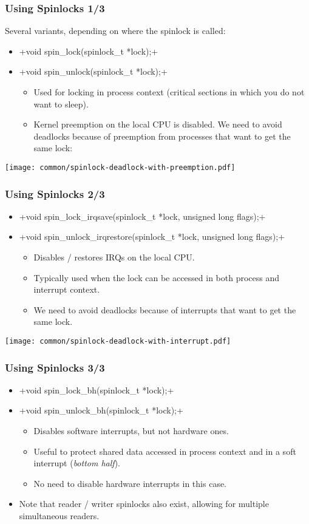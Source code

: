 \begin{frame}[fragile]
  \frametitle{Using Spinlocks 1/3}
  Several variants, depending on where the spinlock is called:
  \begin{itemize}
  \item {}+void spin_lock(spinlock_t *lock);+
  \item {}+void spin_unlock(spinlock_t *lock);+
    \begin{itemize}
    \item Used for locking in process context (critical sections
          in which you do not want to sleep).
    \item Kernel preemption on the local CPU is disabled. We need
          to avoid deadlocks because of preemption from processes
	  that want to get the same lock:
    \end{itemize}
  \end{itemize}
  \texttt{[image: common/spinlock-deadlock-with-preemption.pdf]}
\end{frame}

\begin{frame}[fragile]
  \frametitle{Using Spinlocks 2/3}
  \begin{itemize}
  \item {}+void spin_lock_irqsave(spinlock_t *lock, unsigned long flags);+
  \item {}+void spin_unlock_irqrestore(spinlock_t *lock, unsigned long flags);+
    \begin{itemize}
    \item Disables / restores IRQs on the local CPU.
    \item Typically used when the lock can be accessed in both process
      and interrupt context.
    \item We need to avoid deadlocks because of interrupts that want
          to get the same lock.
    \end{itemize}
  \end{itemize}
  \texttt{[image: common/spinlock-deadlock-with-interrupt.pdf]}
\end{frame}

\begin{frame}[fragile]
  \frametitle{Using Spinlocks 3/3}
  \begin{itemize}
  \item {}+void spin_lock_bh(spinlock_t *lock);+
  \item {}+void spin_unlock_bh(spinlock_t *lock);+
    \begin{itemize}
    \item Disables software interrupts, but not hardware ones.
    \item Useful to protect shared data accessed in process context
      and in a soft interrupt (\emph{bottom half}).
    \item No need to disable hardware interrupts in this case.
    \end{itemize}
  \item Note that reader / writer spinlocks also exist, allowing
	for multiple simultaneous readers.
  \end{itemize}
\end{frame}

